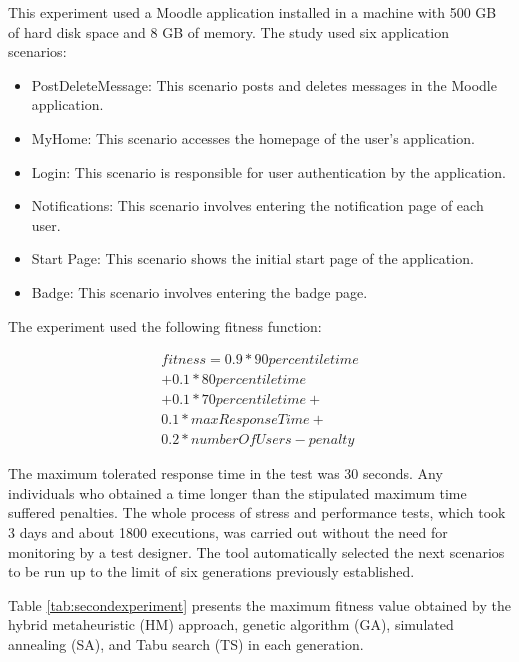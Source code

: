 This experiment used a Moodle application installed in a machine with 500 GB of hard disk space and 8 GB of memory. The study used six application scenarios:

\begin{itemize}
\item PostDeleteMessage: This scenario posts and deletes messages in the Moodle application.
\item MyHome: This scenario accesses the homepage of the user's application.
\item Login: This scenario is responsible for user authentication by the application.
\item Notifications: This scenario involves entering the notification page of each user.
\item Start Page: This scenario shows the initial start page of the application.
\item Badge: This scenario involves entering the badge page.
\end{itemize}

The experiment used the following fitness function:

\begin{equation}
\begin{aligned}
fitness=0.9* 90percentiletime\\
+0.1*80percentiletime\\+
0.1*70percentiletime+\\
0.1*maxResponseTime+\\
0.2*numberOfUsers-penalty
\end{aligned}
\end{equation}

The maximum tolerated response time in the test was 30 seconds.  Any  individuals who obtained a time longer than the stipulated maximum time suffered penalties.  The whole process of stress and performance tests, which took 3 days and about 1800 executions, was carried out without the need for monitoring by a test designer. The tool automatically selected the next scenarios to be run up to the limit of six generations previously established. 

Table \ref{tab:secondexperiment} presents the maximum fitness value obtained by the hybrid metaheuristic (HM) approach, genetic algorithm (GA), simulated annealing (SA), and Tabu search (TS) in each generation. 



